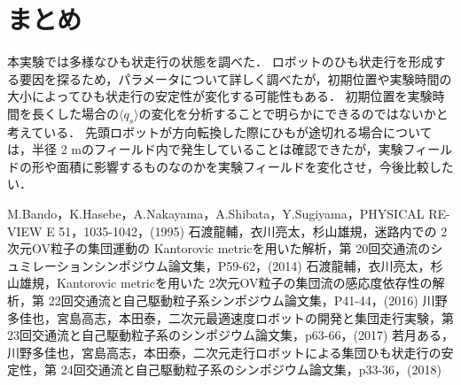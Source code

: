 \documentclass[twocolumn]{jarticle} %
\begin{document}
\section{まとめ}
\vspace{2mm}
本実験では多様なひも状走行の状態を調べた．
ロボットのひも状走行を形成する要因を探るため，パラメータについて詳しく調べたが，初期位置や実験時間の大小によってひも状走行の安定性が変化する可能性もある．
初期位置を実験時間を長くした場合の$\langle q_s \rangle$の変化を分析することで明らかにできるのではないかと考えている．
先頭ロボットが方向転換した際にひもが途切れる場合については，半径 2 mのフィールド内で発生していることは確認できたが，実験フィールドの形や面積に影響するものなのかを実験フィールドを変化させ，今後比較したい．
\vspace{2mm}
\begin{thebibliography}{99}
\vspace{2mm}
 M.Bando，K.Hasebe，A.Nakayama，A.Shibata，Y.Sugiyama，PHYSICAL RE-VIEW E 51，1035-1042，(1995)
 石渡龍輔，衣川亮太，杉山雄規，迷路内での 2次元OV粒子の集団運動の Kantorovic metricを用いた解析，第 20回交通流のシュミレーションシンポジウム論文集，P59-62，(2014)
 石渡龍輔，衣川亮太，杉山雄規，Kantorovic metricを用いた 2次元OV粒子の集団流の感応度依存性の解析，第 22回交通流と自己駆動粒子系シンポジウム論文集，P41-44，(2016)
 川野多佳也，宮島高志，本田泰，二次元最適速度ロボットの開発と集団走行実験，第 23回交通流と自己駆動粒子系のシンポジウム論文集，p63-66，(2017)
 若月ある，川野多佳也，宮島高志，本田泰，二次元走行ロボットによる集団ひも状走行の安定性，第 24回交通流と自己駆動粒子系のシンポジウム論文集，p33-36，(2018)
\end{thebibliography}
\end{document}
